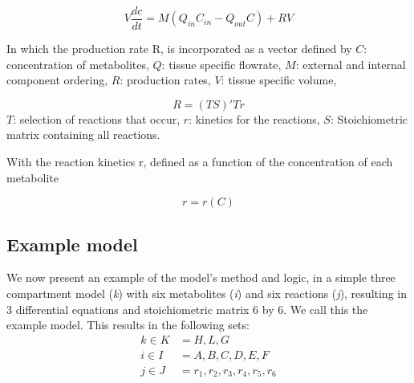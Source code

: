 \documentclass{IEEEtran}
\begin{document}
\begin{equation}
\label{eq:general_eq}
    V \frac{dc}{dt} = M (Q_{in}C_{in} - Q_{out}C) + RV
\end{equation}

In which the production rate R, is incorporated as a vector defined by
$C$: concentration of metabolites,
$Q$: tissue specific flowrate,
$M$: external and internal component ordering,
$R$: production rates,
$V$: tissue specific volume,


\begin{equation}
    R = (T S)' T r
\end{equation}
$T$: selection of reactions that occur,
$r$: kinetics for the reactions,
$S$: Stoichiometric matrix containing all reactions.

With the reaction kinetics r, defined as a function of the concentration of each metabolite

\begin{equation}
    r = r(C)
\end{equation}


\subsection{Example model}

We now present an example of the model's method and logic, in a simple three compartment model (\textit{k}) with six metabolites (\textit{i}) and six reactions (\textit{j}), resulting in 3 differential equations and stoichiometric matrix 6 by 6. We call this the example model. This results in the following sets:
\begin{align*}
k \in K & =  H,L,G \\
i \in I & =  A, B, C, D, E, F \\
j \in J & =  r_1, r_2, r_3, r_4, r_5, r_6
\end{align*}
\end{document}
